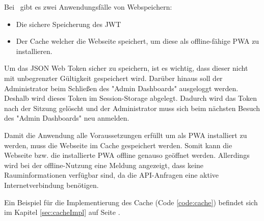 
Bei \ZELIA\ gibt es zwei Anwendungsfälle von Webspeichern:

\begin{itemize}
    \item Die sichere Speicherung des JWT
    \item Der Cache welcher die Webseite speichert, um diese als offline-fähige PWA zu installieren.
\end{itemize}


Um das JSON Web Token sicher zu speichern, ist es wichtig, dass dieser nicht mit unbegrenzter Gültigkeit gespeichert wird. Darüber hinaus soll der Administrator beim Schließen des "Admin Dashboards" ausgeloggt werden. 
Deshalb wird dieses Token im Session-Storage abgelegt. 
Dadurch wird das Token nach der Sitzung gelöscht und der Administrator muss sich beim nächsten Besuch des "Admin Dashboards" neu anmelden.


Damit die Anwendung alle Voraussetzungen erfüllt um als PWA installiert zu werden, muss die Webseite im Cache gespeichert werden. 
Somit kann die Webseite bzw. die installierte PWA offline genauso geöffnet werden. 
Allerdings wird bei der offline-Nutzung eine Meldung angezeigt, dass keine Rauminformationen verfügbar sind, da die API-Anfragen eine aktive Internetverbindung benötigen.

Ein Beispiel für die Implementierung des Cache (Code \ref{code:cache}) befindet sich im Kapitel \ref{sec:cacheImpl} auf Seite \pageref{code:cache}.
 